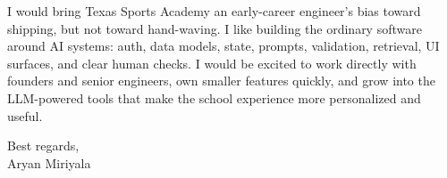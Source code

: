 \documentclass[letterpaper,11pt]{article}
\begin{document}
I would bring Texas Sports Academy an early-career engineer's bias toward shipping, but not toward hand-waving. I like building the ordinary software around AI systems: auth, data models, state, prompts, validation, retrieval, UI surfaces, and clear human checks. I would be excited to work directly with founders and senior engineers, own smaller features quickly, and grow into the LLM-powered tools that make the school experience more personalized and useful.

\vspace{8pt}

Best regards,\\
Aryan Miriyala
\end{document}
